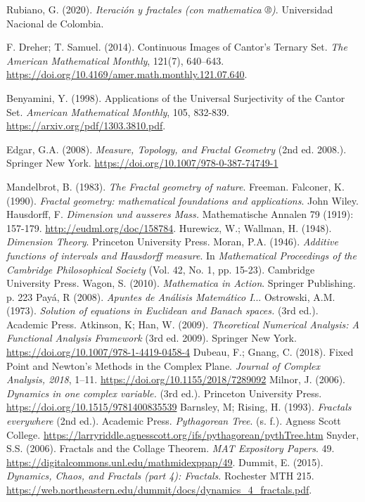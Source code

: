\begin{thebibliography}{99}
    
 Rubiano, G. (2020). \textit{Iteración y fractales (con mathematica ®)}. Universidad Nacional de Colombia.

 F. Dreher; T. Samuel. (2014). Continuous Images of Cantor’s Ternary Set. \textit{The American Mathematical Monthly}, 121(7), 640–643. \url{https://doi.org/10.4169/amer.math.monthly.121.07.640}.

 Benyamini, Y. (1998). Applications of the Universal Surjectivity of the Cantor Set. \textit{American Mathematical Monthly}, 105, 832-839. \url{https://arxiv.org/pdf/1303.3810.pdf}.

 Edgar, G.A. (2008). \textit{Measure, Topology, and Fractal Geometry} (2nd ed. 2008.). Springer New York. \url{https://doi.org/10.1007/978-0-387-74749-1}

 Mandelbrot, B. (1983). \textit{The Fractal geometry of nature}. Freeman.
 Falconer, K. (1990). \textit{Fractal geometry: mathematical foundations and applications}. John Wiley.
 Hausdorff, F. \textit{Dimension und ausseres Mass.} Mathematische Annalen 79 (1919): 157-179. \url{http://eudml.org/doc/158784}.
Hurewicz, W.; Wallman, H. (1948). \textit{Dimension Theory}. Princeton University Press.
Moran, P.A. (1946). \textit{Additive functions of intervals and Hausdorff measure}. In \textit{Mathematical Proceedings of the Cambridge Philosophical Society} (Vol. 42, No. 1, pp. 15-23). Cambridge University Press.
Wagon, S. (2010). \textit{Mathematica in Action}. Springer Publishing. p. 223
 Payá, R (2008). \textit{Apuntes de Análisis Matemático I}...
 Ostrowski, A.M. (1973). \textit{Solution of equations in Euclidean and Banach spaces.} (3rd ed.). Academic Press.
 Atkinson, K; Han, W. (2009). \textit{Theoretical Numerical Analysis: A Functional Analysis Framework} (3rd ed. 2009). Springer New York. \url{https://doi.org/10.1007/978-1-4419-0458-4}
 Dubeau, F.; Gnang, C. (2018). Fixed Point and Newton’s Methods in the Complex Plane. \textit{Journal of Complex Analysis, 2018}, 1–11. \url{https://doi.org/10.1155/2018/7289092}
 Milnor, J. (2006). \textit{Dynamics in one complex variable.} (3rd ed.). Princeton University Press. \url{https://doi.org/10.1515/9781400835539}
 Barnsley, M; Rising, H. (1993). \textit{Fractals everywhere} (2nd ed.). Academic Press.
 \textit{Pythagorean Tree}. (s. f.). Agness Scott College. \url{https://larryriddle.agnesscott.org/ifs/pythagorean/pythTree.htm}
 Snyder, S.S. (2006). Fractals and the Collage Theorem. \textit{MAT Expository Papers}. 49. \url{https://digitalcommons.unl.edu/mathmidexppap/49}.
 Dummit, E. (2015). \textit{Dynamics, Chaos, and Fractals (part 4): Fractals}. Rochester MTH 215. \url{https://web.northeastern.edu/dummit/docs/dynamics_4_fractals.pdf}.


\end{thebibliography}
